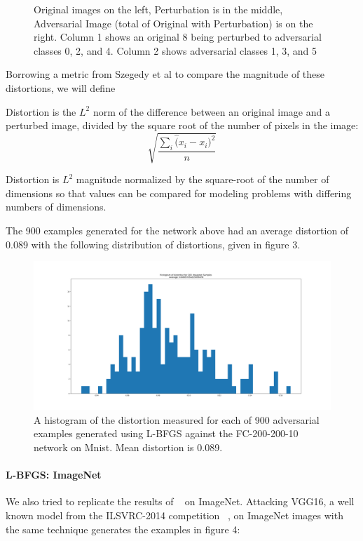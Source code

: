 \begin{figure}[H]
\caption{Original images on the left, Perturbation is in the middle, Adversarial Image (total of Original with Perturbation) is on the right. Column 1 shows an original 8 being perturbed to adversarial classes 0, 2, and 4. Column 2 shows adversarial classes 1, 3, and 5}
\end{figure}
Borrowing a metric from Szegedy et al to compare the magnitude of these distortions, we will define
\begin{definition}{Distortion is the $L^2$ norm of the difference between an original image and a perturbed image, divided by the square root of the number of pixels in the image: }
\[\sqrt{\dfrac{\sum_i \hat (x_i - x_i)^2}{n}}\]
\end{definition}
Distortion is $L^2$ magnitude normalized by the square-root of the number of dimensions so that values can be compared for modeling problems with differing numbers of dimensions. 

The 900 examples generated for the network above had an average distortion of 0.089 with the following distribution of distortions, given in figure 3.

\begin{figure}[H]
\label{lbfgsh}
\includegraphics[trim=200 80 100 100, clip, width=16cm]{c1_figures/FC200-200-10-distortion_hist.png}
\caption{A histogram of the distortion measured for each of 900 adversarial examples generated using L-BFGS against the FC-200-200-10 network on Mnist. Mean distortion is 0.089.}
\end{figure}

\paragraph{L-BFGS: ImageNet}
\label{lbfgs-s}
We also tried to replicate the results of ~\citet{szegedy2013} on ImageNet. Attacking VGG16, a well known model from the ILSVRC-2014 competition ~\citep{simonyan2014very}, on ImageNet images with the same technique generates the examples in figure 4: 

